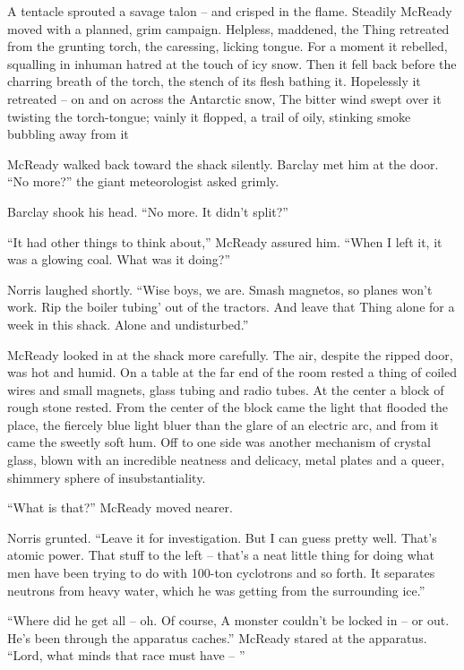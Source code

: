 \documentclass[letterpaper,openany,12pt]{memoir}		%
\begin{document}
A tentacle sprouted a savage talon -- and crisped in the flame. Steadily McReady
moved with a planned, grim campaign. Helpless, maddened, the Thing retreated
from the grunting torch, the caressing, licking tongue. For a moment it
rebelled, squalling in inhuman hatred at the touch of icy snow. Then it fell
back before the charring breath of the torch, the stench of its flesh bathing
it. Hopelessly it retreated -- on and on across the Antarctic snow, The bitter
wind swept over it twisting the torch-tongue; vainly it flopped, a trail of
oily, stinking smoke bubbling away from it

McReady walked back toward the shack silently. Barclay met him at the door. ``No
more?'' the giant meteorologist asked grimly.

Barclay shook his head. ``No more. It didn't split?''

``It had other things to think about,'' McReady assured him. ``When I left it,
it was a glowing coal. What was it doing?''

Norris laughed shortly. ``Wise boys, we are. Smash magnetos, so planes won't
work. Rip the boiler tubing' out of the tractors. And leave that Thing alone for
a week in this shack. Alone and undisturbed.''

McReady looked in at the shack more carefully. The air, despite the ripped door,
was hot and humid. On a table at the far end of the room rested a thing of
coiled wires and small magnets, glass tubing and radio tubes. At the center a
block of rough stone rested. From the center of the block came the light that
flooded the place, the fiercely blue light bluer than the glare of an electric
arc, and from it came the sweetly soft hum. Off to one side was another
mechanism of crystal glass, blown with an incredible neatness and delicacy,
metal plates and a queer, shimmery sphere of insubstantiality.

``What is that?'' McReady moved nearer.

Norris grunted. ``Leave it for investigation. But I can guess pretty well.
That's atomic power. That stuff to the left -- that's a neat little thing for
doing what men have been trying to do with 100-ton cyclotrons and so forth. It
separates neutrons from heavy water, which he was getting from the surrounding
ice.''

``Where did he get all -- oh. Of course, A monster couldn't be locked in -- or
out. He's been through the apparatus caches.'' McReady stared at the apparatus.
``Lord, what minds that race must have -- ''
\end{document}

